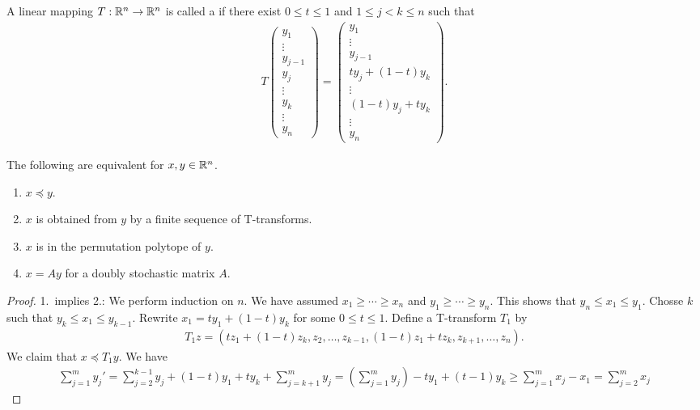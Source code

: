 \begin{definition}
    A linear mapping $T:\mathbb{R}^{n} \to \mathbb{R}^{n}$ is called a  if there exist $0 \leq t \leq 1$ and $1 \leq j < k \leq n$ such that
    \begin{align}
        T \begin{pmatrix}
            y_{1} \\ \vdots \\ y_{j-1} \\ y_{j} \\ \vdots \\ y_{k} \\ \vdots \\ y_{n}
        \end{pmatrix} = \begin{pmatrix}
            y_{1} \\ \vdots \\ y_{j-1} \\ ty_{j}+(1-t)y_{k} \\ \vdots \\ (1-t)y_{j}+ty_{k} \\ \vdots \\ y_{n}
        \end{pmatrix}.
    \end{align}
\end{definition}

\begin{theorem}
    The following are equivalent for $x,y \in \mathbb{R}^{n}$.
    \begin{enumerate}
        \item $x \preceq y$.
        \item $x$ is obtained from $y$ by a finite sequence of T-transforms.
        \item $x$ is in the permutation polytope of $y$.
        \item $x = Ay$ for a doubly stochastic matrix $A$.
    \end{enumerate}
\end{theorem}
\begin{proof}
    1.~implies 2.: We perform induction on $n$. We have assumed $x_{1} \geq \cdots \geq x_{n}$ and $y_{1} \geq \cdots \geq y_{n}$. This shows that $y_{n} \leq x_{1} \leq y_{1}$. Chosse $k$ such that $y_{k} \leq x_{1} \leq y_{k-1}$. Rewrite $x_{1} = ty_{1} + (1-t)y_{k}$ for some $0 \leq t \leq 1$. Define a T-transform $T_{1}$ by
    \begin{align}
        T_{1}z = (tz_{1} + (1-t)z_{k},z_{2},\ldots,z_{k-1},(1-t)z_{1}+tz_{k},z_{k+1},\ldots,z_{n}).
    \end{align}
    We claim that $x \preceq T_{1}y$. We have
    \begin{align}
        \sum_{j=1}^{m} y_{j}' = \sum_{j=2}^{k-1} y_{j} + (1-t)y_{1} + ty_{k} + \sum_{j=k+1}^{m} y_{j} = \left(\sum_{j=1}^{m} y_{j}\right)-ty_{1}+(t-1)y_{k} \geq \sum_{j=1}^{m} x_{j} - x_{1} = \sum_{j=2}^{m} x_{j}
    \end{align}
\end{proof}